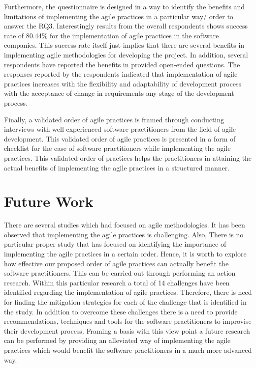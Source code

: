 \documentclass[a4paper,oneside]{bth}
\begin{document}
Furthermore, the questionnaire is designed in a way to identify the benefits and limitations of implementing the agile practices in a particular way/ order to answer the RQ3. Interestingly results from the overall respondents shows success rate of 80.44\% for the implementation of agile practices in the software companies. This success rate itself just implies that there are several benefits in implementing agile methodologies for developing the project. In addition, several respondents have reported the benefits in provided open-ended questions. The responses reported by the respondents indicated that implementation of agile practices increases with the flexibility and adaptability of development process with the acceptance of change in requirements any stage of the development process.

Finally, a validated order of agile practices is framed through conducting interviews with well experienced software practitioners from the field of agile development. This validated order of agile practices is presented in a form of checklist for the ease of software practitioners while implementing the agile practices. This validated order of practices helps the practitioners in attaining the actual benefits of implementing the agile practices in a structured manner.

\section{Future Work}
There are several studies which had focused on agile methodologies. It has been observed that implementing the agile practices is challenging. Also, There is no particular proper study that has focused on identifying the importance of implementing the agile practices in a certain order. Hence, it is worth to explore how effective our proposed order of agile practices can actually benefit the software practitioners. This can be carried out through performing an action research. Within this particular research a total of 14 challenges have been identified regarding the implementation of agile practices. Therefore, there is need for finding the mitigation strategies for each of the challenge that is identified in the study. In addition to overcome these challenges there is a need to provide recommendations, techniques and tools for the software practitioners to improvise their development process. Framing a basis with this view point a future research can be performed by providing an alleviated way of implementing the agile practices which would benefit the software practitioners in a much more advanced way. 
\end{document}
